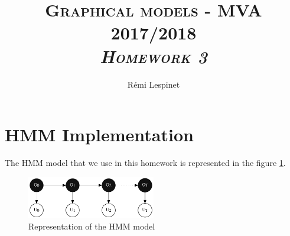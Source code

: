 \documentclass[a4paper, 11pt]{article}
\title{\textsc{Graphical models - MVA 2017/2018 \\ \emph{Homework 3}} }
\author{Rémi Lespinet}
\date{}
\begin{document}
\maketitle
\thispagestyle{fancy}

\section{HMM Implementation}

The HMM model that we use in this homework is represented in the
figure \ref{fig:hmm}.

\begin{figure}[h!]
  \centering
  \includegraphics[width=0.5\textwidth]{hmm.pdf}
  \caption{Representation of the HMM model}\label{fig:hmm}
\end{figure}
\end{document}
